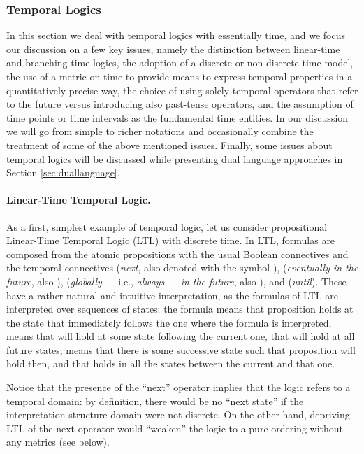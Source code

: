 \subsubsection{Temporal Logics} \label{sec:temporallogics} In this
section we deal with temporal logics with essentially  time,
and we focus our discussion on a few key issues, namely the
distinction between linear-time and branching-time logics, the
adoption of a discrete or non-discrete time model, the use of a metric
on time to provide means to express temporal properties in a
quantitatively precise way, the choice of using solely temporal
operators that refer to the future versus introducing also past-tense
operators, and the assumption of time points or time intervals as the
fundamental time entities. In our discussion we will go from simple to
richer notations and occasionally combine the treatment of some of the
above mentioned issues.  Finally, some  issues about
temporal logics will be discussed while presenting dual language
approaches in Section \ref{sec:duallanguage}.


\paragraph{Linear-Time Temporal Logic.}
As a first, simplest example of temporal logic, let us consider 
propositional Linear-Time Temporal Logic (LTL) with discrete 
time. In LTL, formulas are composed from the atomic propositions 
with the usual Boolean connectives and the temporal connectives  
(\emph{next}, also denoted with the symbol ),  (\emph{eventually 
in the future}, also ),  (\emph{globally} --- i.e., \emph{always} 
--- \emph{in the future}, also ), and  (\emph{until}). These 
have a rather natural and intuitive interpretation, as the formulas 
of LTL are interpreted over  sequences of states: the formula  
means that proposition  holds at the state that immediately 
follows the one where the formula is interpreted,  
means that  will hold at some state following the current 
one,  that  will hold at all future states,  
means that there is some successive state such that proposition  
will hold then, and that  holds in all the states between 
the current and that one.

Notice that the presence of the ``next'' operator  implies 
that the logic refers to a  temporal domain: by definition, 
there would be no ``next state'' if the interpretation structure 
domain were not discrete. On the other hand, depriving LTL of 
the next operator would ``weaken'' the logic to a pure ordering 
without any metrics (see below).

